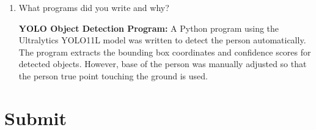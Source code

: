 \begin{enumerate}
\begin{studentSpace}
\begin{enumerate}
Cross-ratio is only valid when all points lie on the same line in the real world. In practice, objects may not be perfectly aligned, causing deviations from the theoretical model.

\item \textbf{Camera Perspective Distortion}

Real-world cameras introduce perspective distortion, lens distortion, and slight viewpoint changes. These effects violate the ideal pinhole camera assumptions used in projective geometry.

\item \textbf{Ground Plane Assumption}

The method assumes that all objects lie on the same flat ground plane. If the objects are at different heights or on uneven surfaces, the estimated distances become inaccurate.

\item \textbf{Measurement Error in Reference Distance}

The manually measured reference distance (\(10\) ft) may itself contain errors. Since all estimated distances depend on this measurement, any inaccuracy propagates to the final results.

\item \textbf{Image Resolution Limitations}

For small objects such as the tennis ball and water bottle, a change of only a few pixels can alter the computed cross-ratio. Low image resolution therefore reduces measurement accuracy.

\end{enumerate}
\end{studentSpace}


\item What programs did you write and why?  
\begin{studentSpace}

    \textbf{YOLO Object Detection Program:}
    A Python program using the Ultralytics YOLO11L model was written to detect the person automatically. The program extracts the bounding box coordinates and confidence scores for detected objects. However, base of the person was manually adjusted so that the person true point touching the ground is used.
\end{studentSpace}


\end{enumerate}

\section{Submit}


